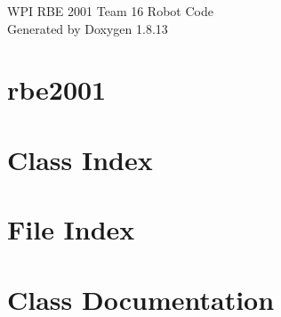 \documentclass[twoside]{book}
\newcommand{\+}{\discretionary{\mbox{\scriptsize$\hookleftarrow$}}{}{}}
\newcommand{\clearemptydoublepage}{%
  \newpage{\pagestyle{empty}\cleardoublepage}%
}
\begin{document}
\hypersetup{pageanchor=false,
             bookmarksnumbered=true,
             pdfencoding=unicode
            }
\begin{titlepage}
\vspace*{7cm}
\begin{center}%
{\Large W\+PI R\+BE 2001 Team 16 Robot Code }\\
\vspace*{1cm}
{\large Generated by Doxygen 1.8.13}\\
\end{center}
\end{titlepage}
\clearemptydoublepage
{}
\tableofcontents
\clearemptydoublepage
{}
\hypersetup{pageanchor=true}

\chapter{rbe2001}
\label{md_rbe2001__r_e_a_d_m_e}

\chapter{Class Index}

\chapter{File Index}

\chapter{Class Documentation}














\end{document}
